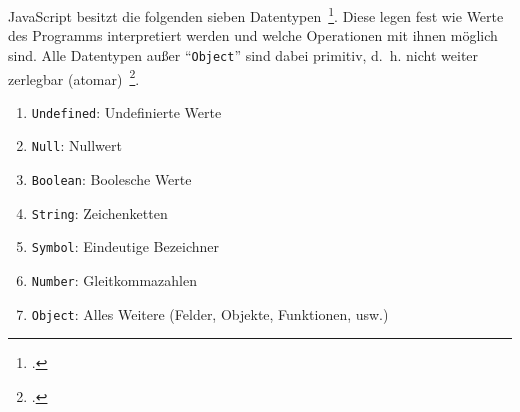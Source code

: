 
JavaScript besitzt die folgenden sieben Datentypen~\footcite[Abschn.~6.1]{ECMASCRIPT:2019}.
Diese legen fest wie Werte des Programms interpretiert werden und welche Operationen mit ihnen möglich sind. Alle Datentypen außer \enquote{\texttt{Object}} sind dabei primitiv, d.~h. nicht weiter zerlegbar (atomar)~\footcite[Abschnitt 4.3.2]{ECMASCRIPT:2019}.

\begin{enumerate}
  \item \texttt{Undefined}: Undefinierte Werte
  \item \texttt{Null}: Nullwert
  \item \texttt{Boolean}: Boolesche Werte
  \item \texttt{String}: Zeichenketten
  \item \texttt{Symbol}: Eindeutige Bezeichner
  \item \texttt{Number}: Gleitkommazahlen
  \item \texttt{Object}: Alles Weitere (Felder, Objekte, Funktionen, usw.)
\end{enumerate}

